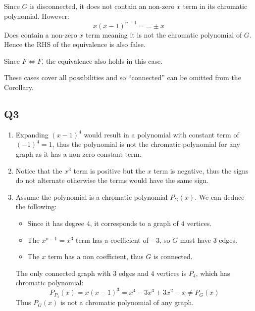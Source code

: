\documentclass[a4paper, 11pt]{article}
\begin{document}
\begin{multicols*}{2}
\begin{enumerate}[label=(\alph*)]
\begin{itemize}
			            Since $G$ is disconnected, it does not contain an non-zero $x$ term in its chromatic polynomial. However:
			            $$x(x-1)^{n-1}=\dots\pm x$$
			            Does contain a non-zero $x$ term meaning it is not the chromatic polynomial of $G$. Hence the RHS of the equivalence is also false.

			            Since $F\iff F$, the equivalence also holds in this case.

		      \end{itemize}
		      These cases cover all possibilities and so ``connected'' can be omitted from the Corollary.



	\end{enumerate}

	\subsection*{Q3}
	\begin{enumerate}[label=(\alph*)]
		\item Expanding $(x-1)^4$ would result in a polynomial with constant term of $(-1)^4=1$, thus the polynomial is not the chromatic polynomial for any graph as it has a non-zero constant term.

		\item Notice that the $x^3$ term is positive but the $x$ term is negative, thus the signs do not alternate otherwise the terms would have the same sign.

		\item Assume the polynomial is a chromatic polynomial $P_G(x)$. We can deduce the following:
		      \begin{itemize}
			      \item Since it has degree $4$, it corresponds to a graph of $4$ vertices.
			      \item The $x^{n-1}=x^3$ term has a coefficient of $-3$, so $G$ must have $3$ edges.
			      \item The $x$ term has a non coefficient, thus $G$ is connected.
		      \end{itemize}
		      The only connected graph with $3$ edges and $4$ vertices is $P_4$, which has chromatic polynomial:
		      \[
			      P_{P_4}(x)=x(x-1)^3= x^4 - 3x^3 + 3x^2 - x \neq P_G(x)
		      \]
		      Thus $P_G(x)$ is not a chromatic polynomial of any graph.


	\end{enumerate}


\end{multicols*}
\end{document}
